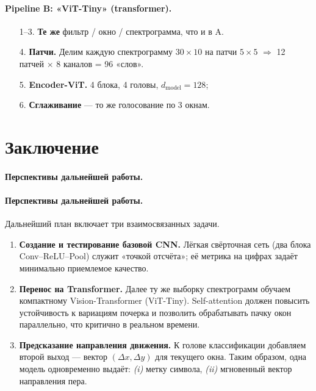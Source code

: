 \documentclass[12pt,a4paper]{article}
\begin{document}
\paragraph{Pipeline B: «ViT-Tiny» (transformer).}
\begin{enumerate}
  \item[1–3.] \textbf{Те же} фильтр / окно / спектрограмма, что и в A.
  \item[4.] \textbf{Патчи.}  Делим каждую спектрограмму $30{\times}10$  
        на патчи $5{\times}5$  $\Rightarrow$  12 патчей $\times$ 8 каналов = 96 «слов».
  \item[5.] \textbf{Encoder-ViT.} 4 блока, 4 головы, $d_{\text{model}}{=}128$;  
  \item[6.] \textbf{Сглаживание} — то же голосование по 3 окнам.
\end{enumerate}


\section*{Заключение}
\paragraph{Перспективы дальнейшей работы.}
\paragraph{Перспективы дальнейшей работы.}
Дальнейший план включает три взаимосвязанных задачи.

\begin{enumerate}
  \item \textbf{Создание и тестирование базовой CNN.}  
        Лёгкая свёрточная сеть (два блока Conv–ReLU–Pool) служит «точкой отсчёта»; её метрика на цифрах задаёт минимально приемлемое качество.

  \item \textbf{Перенос на Transformer.}  
        Далее ту же выборку спектрограмм обучаем компактному Vision-Transformer (ViT-Tiny). Self-attention должен повысить устойчивость к вариациям почерка и позволить обрабатывать пачку окон параллельно, что критично в реальном времени.

  \item \textbf{Предсказание направления движения.}  
        К голове классификации добавляем второй выход — вектор \((\Delta x, \Delta y)\) для текущего окна. Таким образом, одна модель одновременно выдаёт:  
        \emph{(i)} метку символа, \emph{(ii)} мгновенный вектор направления пера.
\end{enumerate}
\end{document}
